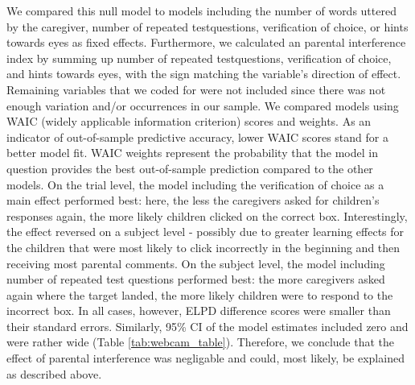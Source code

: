 \documentclass[
  man,floatsintext]{apa6}
\begin{document}
We compared this null model to models including the number of words uttered by the caregiver, number of repeated testquestions, verification of choice, or hints towards eyes as fixed effects. Furthermore, we calculated an parental interference index by summing up number of repeated testquestions, verification of choice, and hints towards eyes, with the sign matching the variable's direction of effect. Remaining variables that we coded for were not included since there was not enough variation and/or occurrences in our sample.
We compared models using WAIC (widely applicable information criterion) scores and weights. As an indicator of out-of-sample predictive accuracy, lower WAIC scores stand for a better model fit. WAIC weights represent the probability that the model in question provides the best out-of-sample prediction compared to the other models.
On the trial level, the model including the verification of choice as a main effect performed best: here, the less the caregivers asked for children's responses again, the more likely children clicked on the correct box. Interestingly, the effect reversed on a subject level - possibly due to greater learning effects for the children that were most likely to click incorrectly in the beginning and then receiving most parental comments. On the subject level, the model including number of repeated test questions performed best: the more caregivers asked again where the target landed, the more likely children were to respond to the incorrect box. In all cases, however, ELPD difference scores were smaller than their standard errors. Similarly, 95\% CI of the model estimates included zero and were rather wide (Table \ref{tab:webcam_table}). Therefore, we conclude that the effect of parental interference was negligable and could, most likely, be explained as described above.
\end{document}

